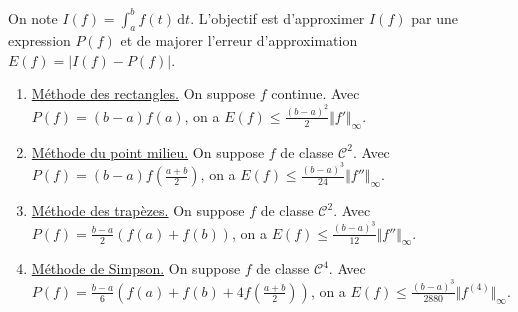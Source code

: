   \begin{application}
    On note $I(f) = \int_a^b f(t) \, \mathrm{d}t$. L'objectif est d'approximer $I(f)$ par une expression $P(f)$ et de majorer l'erreur d'approximation $E(f) = \vert I(f) - P(f) \vert$.
    \begin{enumerate}[label={\bfseries(\roman*)}]
      \item \uline{Méthode des rectangles.} On suppose $f$ continue. Avec $P(f) = (b-a)f(a)$, on a $E(f) \leq \frac{(b-a)^2}{2} \Vert f' \Vert_\infty$.
      \item \uline{Méthode du point milieu.} On suppose $f$ de classe $\mathcal{C}^2$. Avec $P(f) = (b-a)f \left( \frac{a+b}{2} \right)$, on a $E(f) \leq \frac{(b-a)^3}{24} \Vert f'' \Vert_\infty$.
      \item \uline{Méthode des trapèzes.} On suppose $f$ de classe $\mathcal{C}^2$. Avec $P(f) = \frac{b-a}{2} (f(a) + f(b))$, on a $E(f) \leq \frac{(b-a)^3}{12} \Vert f'' \Vert_\infty$.
      \item \uline{Méthode de Simpson.} On suppose $f$ de classe $\mathcal{C}^4$. Avec $P(f) = \frac{b-a}{6} \left(f(a) + f(b) + 4f \left( \frac{a+b}{2} \right)\right)$, on a $E(f) \leq \frac{(b-a)^3}{2880} \Vert f^{(4)} \Vert_\infty$.
    \end{enumerate}
  \end{application}


